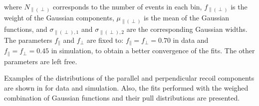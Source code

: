 where $N_{\parallel(\perp)}$ corresponds to the number of events in each \qtZ bin, $f_{\parallel(\perp)}$ is the weight of the Gaussian components, $\mu_{\parallel(\perp)}$ is the mean of the Gaussian functions, and $\sigma_{\parallel(\perp),1}$ and $\sigma_{\parallel(\perp),2}$ are the corresponding Gaussian widths. The parameters $f_{\parallel}$ and $f_{\perp}$ are fixed to: $f_{\parallel} = f_{\perp} = 0.70$ in data and $f_{\parallel} = f_{\perp} = 0.45$ in simulation, to obtain a better convergence of the fits. The other parameters are left free.

Examples of the distributions of the parallel and perpendicular recoil components are shown in  for data and simulation. Also, the fits performed with the weighed combination of Gaussian functions and their pull distributions are presented.

